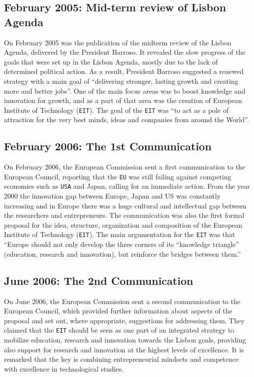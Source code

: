 \documentclass[11pt,a4paper,oneside,twocolumn]{IEEEtran}
\begin{document}
\subsection{February 2005: Mid-term review of Lisbon Agenda}
On February 2005 was the publication of the midterm review of the Lisbon Agenda, delivered by the President Barroso.
It revealed the slow progress of the goals that were set up in the Lisbon Agenda, mostly due to the lack of determined political action\cite{3_2}.
As a result, President Barroso suggested a renewed strategy with a main goal of ``delivering stronger, lasting growth and creating more and better jobs''\cite{3_3}.
One of the main focus areas was to boost knowledge and innovation for growth, and as a part of that area was the creation of European Institute of Technology (\texttt{EIT})\cite{3_3}.
The goal of the \texttt{EIT} was ``to act as a pole of attraction for the very best minds, ideas and companies from around the World''\cite{3_3}.

\subsection{February 2006: The 1st Communication}
On February 2006, the European Commission sent a first communication to the European Council, reporting that the \texttt{EU} was still failing against competing economies such as \texttt{USA} and Japan, calling for an immediate action. From the year 2000 the innovation gap between Europe, Japan and US was constantly increasing and in Europe there was a huge cultural and intellectual gap between the researchers and entrepreneurs\cite{5_4}.
The communication was also the first formal proposal for the idea, structure, organization and composition of the European Institute of Technology (\texttt{EIT}). The main argumentation for the \texttt{EIT} was that ``Europe should not only develop the three corners of its ``knowledge triangle'' (education, research and innovation), but reinforce the bridges between them.''\cite{5_4}

\subsection{June 2006: The 2nd Communication}
On June 2006, the European Commission sent a second communication to the European Council, which provided further information about aspects of the proposal and set out, where appropriate, suggestions for addressing them. They claimed that the \texttt{EIT} should be seen as one part of an integrated strategy to mobilize education, research and innovation towards the Lisbon goals, providing also support for research and innovation at the highest levels of excellence. It is remarked that the key is combining entrepreneurial mindsets and competence with excellence in technological studies\cite{3_5}.
\end{document}

